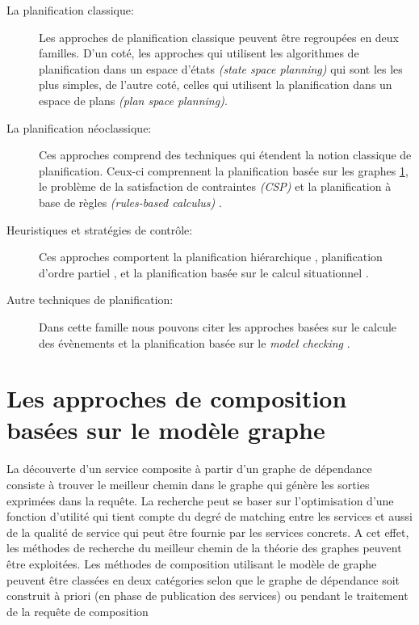   \renewcommand{\descriptionlabel}[1]{\hspace{0.5cm}\textbullet~\textsf{#1}}
  \begin{description}
  \item [La planification classique: ] Les approches de planification
    classique \cite{akkiraju2004executing, zeng2008dynamic} peuvent
    être regroupées en deux familles. D'un coté, les approches qui
    utilisent les algorithmes de planification dans un espace d'états
    \textit{(state space planning)} qui sont les les plus simples, de
    l'autre coté, celles qui utilisent la planification dans un espace
    de plans \textit{(plan space planning)}.

  \item [La planification néoclassique:] Ces approches comprend des
    techniques qui étendent la notion classique de
    planification. Ceux-ci comprennent la planification basée sur les
    graphes \ref{sec:graph-base-composition}, le problème de la
    satisfaction de contraintes \textit{(CSP)}
    \cite{paik2007automatic} et la planification à base de règles
    \textit{(rules-based calculus)} \cite{medjahed2004semantic,
      rao2006mixed}.

  \item [Heuristiques et stratégies de contrôle:] Ces approches
    comportent la planification hiérarchique \cite{wu2003automating,
      sirin2004htn}, planification d'ordre partiel \cite{peer2005pop,
      klusch2005semantic}, et la planification basée sur le calcul
    situationnel \cite{mcilraith2002adapting, sohrabi2009web}.

  \item [Autre techniques de planification:] Dans cette famille nous
    pouvons citer les approches basées sur le calcule des évènements
    \cite{aydin2008automated} et la planification basée sur le
    \textit{model checking}
    \cite{pistore2004planning,pistore2005automated}.
  \end{description}
  \enddescription

  \section{Les approches de composition basées sur le modèle graphe}
  \label{sec:graph-base-composition}

  La découverte d’un service composite à partir d’un graphe de
  dépendance consiste à trouver le meilleur chemin dans le graphe qui
  génère les sorties exprimées dans la requête. La recherche peut se
  baser sur l’optimisation d’une fonction d’utilité qui tient compte
  du degré de matching entre les services et aussi de la qualité de
  service qui peut être fournie par les services concrets. A cet
  effet, les méthodes de recherche du meilleur chemin de la théorie
  des graphes peuvent être exploitées.  Les méthodes de composition
  utilisant le modèle de graphe peuvent être classées en deux
  catégories selon que le graphe de dépendance soit construit à priori
  (en phase de publication des services) ou pendant le traitement de
  la requête de composition

